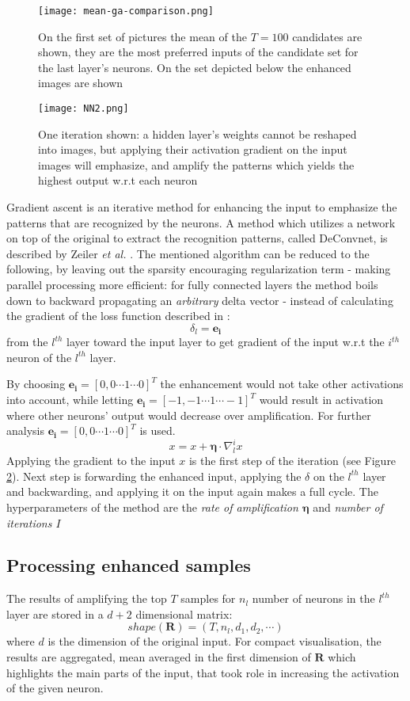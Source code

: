 \begin{figure}
    \centering
    \texttt{[image: mean-ga-comparison.png]}
    \caption{On the first set of pictures the mean of the $T=100$ candidates are shown, they are the most preferred inputs of the candidate set for the last layer's neurons. On the set depicted below the enhanced images are shown}
    \label{fig:mean-ga-comp}
\end{figure}
\begin{figure}
    \centering
    \texttt{[image: NN2.png]}
    \caption{One iteration shown: a hidden layer's weights cannot be reshaped into images, but applying their activation gradient on the input images will emphasize, and amplify the patterns which yields the highest output w.r.t each neuron}
    \label{fig:n2}
\end{figure}
Gradient ascent is an iterative method for enhancing the input to emphasize the patterns that are recognized by the neurons. A method which utilizes a network on top of the original to extract the recognition patterns, called DeConvnet, is described by Zeiler \emph{et al.} \cite{zeiler2014visualizing}. The mentioned algorithm can be reduced to the following, by leaving out the sparsity encouraging regularization term - making parallel processing more efficient:
for fully connected layers the method boils down to backward propagating an \emph{arbitrary} delta vector - instead of calculating the gradient of the loss function described in \cite{zeiler2014visualizing}:
$$
\delta_l = \mathbf{e_{i}}
$$
from the $l^{th}$ layer toward the input layer to get gradient of the input w.r.t the $i^{th}$ neuron of the $l^{th}$ layer. 

By choosing $\mathbf{e_{i}} = [0, 0 \cdots 1 \cdots 0]^T$ the enhancement would not take other activations into account, while letting $\mathbf{e_i} = [-1, -1 \cdots 1 \cdots -1]^T$ would result in activation where other neurons' output would decrease over amplification. For further analysis $\mathbf{e_i} = [0, 0 \cdots 1 \cdots 0]^T$ is used.
$$x = x + \mathbf{\eta}\cdot\nabla_l^i x$$
Applying the gradient to the input $x$ is the first step of the iteration (see Figure \ref{fig:n2}). Next step is forwarding the enhanced input, applying the $\delta$ on the $l^{th}$ layer and backwarding, and applying it on the input again makes a full cycle.
The hyperparameters of the method are the \emph{rate of amplification $\mathbf{\eta}$} and \emph{number of iterations $I$}

\subsection{Processing enhanced samples}
The results of amplifying the top $T$ samples for $n_l$ number of neurons in the $l^{th}$ layer are stored in a $d + 2$ dimensional matrix:
$$
    shape(\mathbf{R}) = (T, n_l, d_1, d_2, \cdots)
$$
where $d$ is the dimension of the original input.
For compact visualisation, the results are aggregated, mean averaged in the first dimension of $\mathbf{R}$ which highlights the main parts of the input, that took role in increasing the activation of the given neuron.


